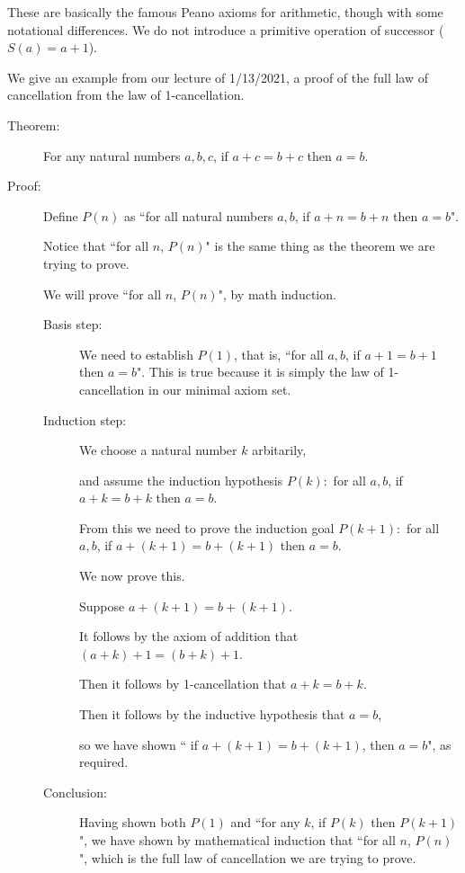 \documentclass[12pt]{article}
\begin{document}
These are basically the famous Peano axioms for arithmetic, though with some notational differences.   We do not introduce a primitive operation of successor ($S(a)=a+1$).

We give an example from our lecture of 1/13/2021, a proof of the full law of cancellation from the law of 1-cancellation.

\begin{description}

\item[Theorem:]  For any natural numbers $a,b,c$, if $a+c=b+c$ then $a=b$.

\item[Proof:]  Define $P(n)$ as ``for all natural numbers $a,b$, if $a+n=b+n$ then $a=b$".

Notice that ``for all $n$, $P(n)$" is the same thing as the theorem we are trying to prove.

We will prove ``for all $n$, $P(n)$", by math induction.

\begin{description}

\item[Basis step:]  We need to establish $P(1)$, that is, ``for all $a,b$, if $a+1=b+1$ then $a=b$".  This is true because it is simply the law of 1-cancellation in our minimal axiom set.

\item[Induction step:]  We choose a natural number $k$ arbitarily,

and assume the induction hypothesis $P(k):$  for all $a,b$, if $a+k=b+k$ then $a=b$.

From this we need to prove the induction goal $P(k+1):$  for all $a,b$, if $a+(k+1) = b+(k+1)$ then $a=b$.

We now prove this.  

Suppose $a+(k+1)=b+(k+1)$. 

 It follows by the axiom of addition that $(a+k)+1 = (b+k)+1$.

Then it follows by 1-cancellation that $a+k=b+k$.

Then it follows by the inductive hypothesis that $a=b$, 

so we have shown `` if $a+(k+1)=b+(k+1)$, then $a=b$", as required.

\item[Conclusion:]  Having shown both $P(1)$ and ``for any $k$, if $P(k)$ then $P(k+1)$", we have shown by mathematical induction
that ``for all $n$, $P(n)$", which is the full law of cancellation we are trying to prove.

\end{description}

\end{description}
\end{document}
